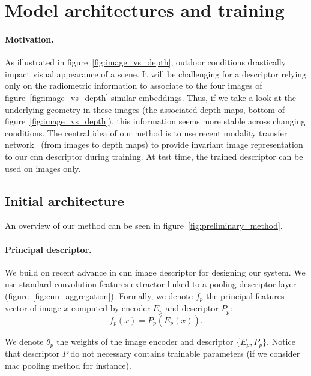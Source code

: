 \section{Model architectures and training}
\label{sec:preliminary_work}

\paragraph{Motivation.}

As illustrated in figure~\ref{fig:image_vs_depth}, outdoor conditions drastically impact visual appearance of a scene. It will be challenging for a descriptor relying only on the radiometric information to associate to the four images of figure~\ref{fig:image_vs_depth} similar embeddings. Thus, if we take a look at the underlying geometry in these images (\ie the associated depth maps, bottom of figure~\ref{fig:image_vs_depth}), this information seems more stable across changing conditions. The central idea of our method is to use recent modality transfer network~\citep{Eigen2014, Godard2017, Mahjourian2018} (from images to depth maps) to provide invariant image representation to our \ac{cnn} descriptor during training. At test time, the trained descriptor can be used on images only.

\subsection{Initial architecture}

An overview of our method can be seen in figure~\ref{fig:preliminary_method}.

\paragraph{Principal descriptor.}
We build on recent advance in \ac{cnn} image descriptor for designing our system. We use standard convolution features extractor linked to a pooling descriptor layer (figure~\ref{fig:cnn_aggregation}). Formally, we denote $f_p$ the principal features vector of image $x$ computed by encoder $E_p$ and descriptor $P_p$:
\begin{equation}
	\label{eq:desc_details}
	f_p(x) = P_p(E_p(x)).
\end{equation}

We denote $\theta_{p}$ the weights of the image encoder and descriptor $\{E_p, P_p\}$. Notice that descriptor $P$ do not necessary contains trainable parameters (if we consider \ac{mac} pooling method for instance).

